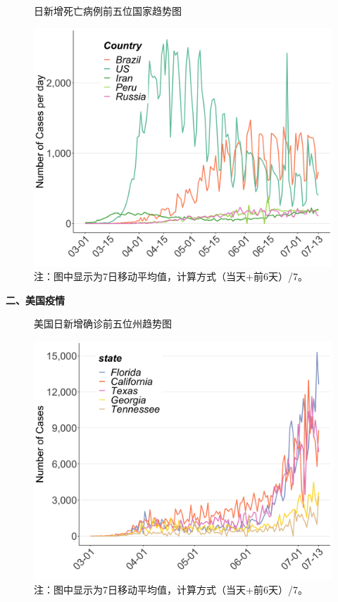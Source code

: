 \documentclass[]{article}
\begin{document}
\begin{minipage}{\textwidth}
  \begin{figure}[H]
  \centering
  \caption{日新增死亡病例前五位国家趋势图}
  \includegraphics[]{./input/covid3.png}
  \captionsetup{font=large}\caption*{注：图中显示为7日移动平均值，计算方式（当天+前6天）/7。}
  \end{figure}
\end{minipage}

\begin{huge}{\textcolor{glaucous}{\textbf {二、美国疫情}}}\end{huge}

\begin{minipage}{\textwidth}
  \begin{figure}[H]
  \centering
  \caption{美国日新增确诊前五位州趋势图}
  \includegraphics[]{./input/covid5.png}
  \captionsetup{font=large}\caption*{注：图中显示为7日移动平均值，计算方式（当天+前6天）/7。}
  \end{figure}
\end{minipage}
\end{document}
